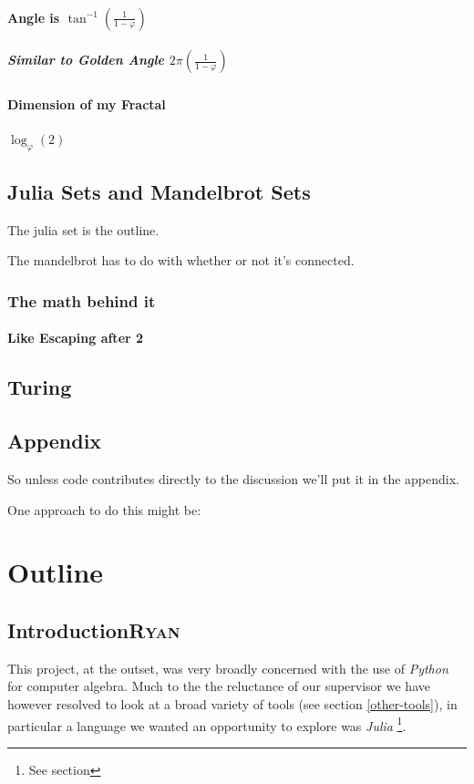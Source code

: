 \documentclass[11pt]{article}
\begin{document}
\paragraph{Angle is \(\tan^{-1}\left( \frac{1}{1-\varphi}\right)\)}
\label{sec:orgbeddac9}
\subparagraph{Similar to Golden Angle \(2 \pi \left( \frac{1}{1-\varphi}\right)\)}
\label{sec:orgc87127a}
\paragraph{Dimension of my Fractal}
\label{sec:org0784cfe}
\(\log_{\varphi}(2)\)

\subsection{Julia Sets and Mandelbrot Sets}
\label{julia-set}
The julia set is the outline.

The mandelbrot has to do with whether or not it's connected.
\subsubsection{The math behind it}
\label{sec:org649235e}
\paragraph{Like Escaping after 2}
\label{sec:org2cb183a}
\subsection{Turing}
\label{sec:orgb46879c}

\subsection{Appendix}
\label{appendix}
So unless code contributes directly to the discussion we'll put it in the appendix.

One approach to do this might be:


\section{Outline}
\label{sec:orga010f91}
\subsection{Introduction\hfill{}\textsc{Ryan}}
\label{sec:org5660082}
This project, at the outset, was very broadly concerned with the use of \emph{Python} for
computer algebra. Much to the the reluctance of our supervisor we have however
resolved to look at a broad variety of tools (see section \ref{other-tools}),
in particular a language we wanted an opportunity to explore was \emph{Julia}
\cite{bezansonJuliaFreshApproach2017} \footnote{See section}.
\end{document}

